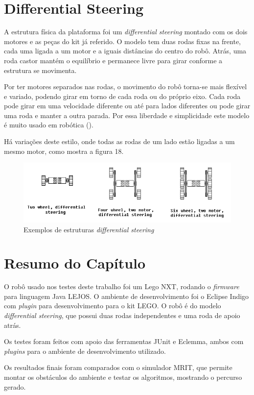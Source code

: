 \section{Differential Steering}

A estrutura física da plataforma foi um \textit{differential steering} montado com os dois motores e as peças do kit já referido. O modelo tem duas rodas fixas na frente, cada uma ligada a um motor e a iguais distâncias do centro do robô. Atrás, uma roda castor mantém o equilíbrio e permanece livre para girar conforme a estrutura se movimenta.

Por ter motores separados nas rodas, o movimento do robô torna-se mais flexível e variado, podendo girar em torno de cada roda ou do próprio eixo. Cada roda pode girar em uma velocidade diferente ou até para lados diferentes ou pode girar uma roda e manter a outra parada. Por essa liberdade e simplicidade este modelo é muito usado em robótica (\cite{Mataric2007}).

Há variações deste estilo, onde todas as rodas de um lado estão ligadas a um mesmo motor, como mostra a figura 18.

\begin{figure}[h]
	\centering
	\label{fig18}
		\includegraphics[keepaspectratio=true,scale=0.9]{figuras/3differentialSteering.png}
	\caption{Exemplos de estruturas \textit{differential steering} \cite{IMG_DIFFERENTIAL_STEERING_SITE}}
\end{figure}

\section{Resumo do Capítulo}

O robô usado nos testes deste trabalho foi um Lego NXT, rodando o \textit{firmware} para linguagem Java LEJOS. O ambiente de desenvolvimento foi o Eclipse Indigo com \textit{plugin} para desenvolvimento para o kit LEGO. O robô é do modelo \textit{differential steering}, que possui duas rodas independentes e uma roda de apoio atrás.

Os testes foram feitos com apoio das ferramentas JUnit e Eclemma, ambos com \textit{plugins} para o ambiente de desenvolvimento utilizado.

Os resultados finais foram comparados com o simulador MRIT, que permite montar os obstáculos do ambiente e testar os algoritmos, mostrando o percurso gerado.